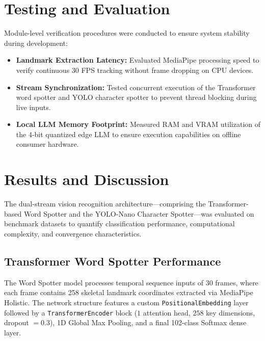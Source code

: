\section{Testing and Evaluation}
Module-level verification procedures were conducted to ensure system stability during development:
\begin{itemize}
\item \textbf{Landmark Extraction Latency:} Evaluated MediaPipe processing speed to verify continuous 30 FPS tracking without frame dropping on CPU devices.
\item \textbf{Stream Synchronization:} Tested concurrent execution of the Transformer word spotter and YOLO character spotter to prevent thread blocking during live inputs.
\item \textbf{Local LLM Memory Footprint:} Measured RAM and VRAM utilization of the 4-bit quantized edge LLM to ensure execution capabilities on offline consumer hardware.
\end{itemize}

\section{Results and Discussion}
The dual-stream vision recognition architecture—comprising the Transformer-based Word Spotter and the YOLO-Nano Character Spotter—was evaluated on benchmark datasets to quantify classification performance, computational complexity, and convergence characteristics.

\subsection{Transformer Word Spotter Performance}
The Word Spotter model processes temporal sequence inputs of 30 frames, where each frame contains 258 skeletal landmark coordinates extracted via MediaPipe Holistic. The network structure features a custom \texttt{PositionalEmbedding} layer followed by a \texttt{TransformerEncoder} block ($1$ attention head, $258$ key dimensions, dropout $= 0.3$), 1D Global Max Pooling, and a final 102-class Softmax dense layer.

